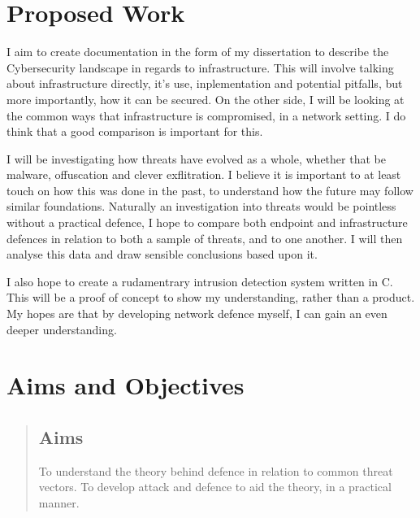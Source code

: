 \section{Proposed Work}
\label{proposed}
I aim to create documentation in the form of my dissertation to describe the Cybersecurity landscape in regards to infrastructure. 
This will involve talking about infrastructure directly, it's use, inplementation and potential pitfalls, but more importantly, how it can be secured.
On the other side, I will be looking at the common ways that infrastructure is compromised, in a network setting. 
I do think that a good comparison is important for this. 

I will be investigating how threats have evolved as a whole,
whether that be malware, offuscation and clever exflitration. I believe it is important to at least touch on how this was done in the past, 
to understand how the future may follow similar foundations. Naturally an investigation into threats would be pointless without a practical defence, 
I hope to compare both endpoint and infrastructure defences in relation to both a sample of threats, and to one another. I will then analyse this data and draw sensible conclusions based upon it.

I also hope to create a rudamentrary intrusion detection system written in C. This will be a proof of concept to show my understanding, rather than a product. My hopes are that by developing network defence myself, 
I can gain an even deeper understanding.

\section{Aims and Objectives}
\begin{quote}
\subsection{Aims}
	To understand the theory behind defence in relation to common threat vectors.
	To develop attack and defence to aid the theory, in a practical manner.
\end{quote}

